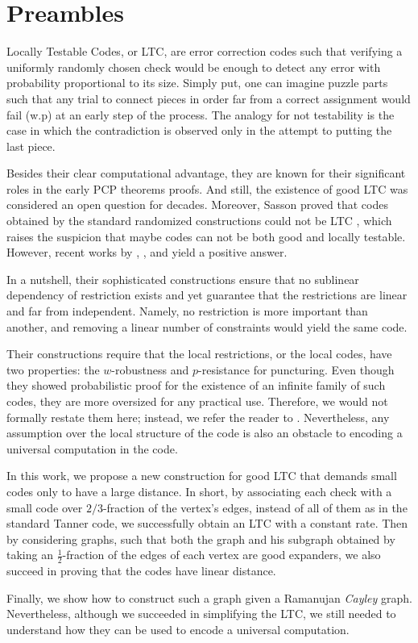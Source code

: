 \section{Preambles}

Locally Testable Codes, or LTC, are error correction codes such that verifying a uniformly randomly chosen check would be enough to detect any error with probability proportional to its size. Simply put, one can imagine puzzle parts such that any trial to connect pieces in order far from a correct assignment would fail (w.p) at an early step of the process. The analogy for not testability is the case in which the contradiction is observed only in the attempt to putting the last piece.     

Besides their clear computational advantage, they are known for their significant roles in the early PCP theorems proofs. And still, the existence of good LTC was considered an open question for decades. Moreover, Sasson proved that codes obtained by the standard randomized constructions could not be LTC \cite{Sasson}, which raises the suspicion that maybe codes can not be both good and locally testable. However, recent works by \cite{Dinur}, \cite{Pavel}, and \cite{leverrier2022quantum} yield a positive answer.

In a nutshell, their sophisticated constructions ensure that no sublinear dependency of restriction exists and yet guarantee that the restrictions are linear and far from independent. Namely, no restriction is more important than another, and removing a linear number of constraints would yield the same code.  

Their constructions require that the local restrictions, or the local codes, have two properties: the $w$-robustness and $p$-resistance for puncturing. Even though they showed probabilistic proof for the existence of an infinite family of such codes, they are more oversized for any practical use. Therefore, we would not formally restate them here; instead, we refer the reader to \cite{leverrier2022quantum}. Nevertheless, any assumption over the local structure of the code is also an obstacle to encoding a universal computation in the code. 

In this work, we propose a new construction for good LTC that demands small codes only to have a large distance. In short, by associating each check with a small code over $2/3$-fraction of the vertex's edges, instead of all of them as in the standard Tanner code, we successfully obtain an LTC with a constant rate. Then by considering graphs, such that both the graph and his subgraph obtained by taking an $\frac{1}{2}$-fraction of the edges of each vertex are good expanders, we also succeed in proving that the codes have linear distance. 

Finally, we show how to construct such a graph given a Ramanujan \emph{Cayley} graph. Nevertheless, although we succeeded in simplifying the LTC, we still needed to understand how they can be used to encode a universal computation.  


